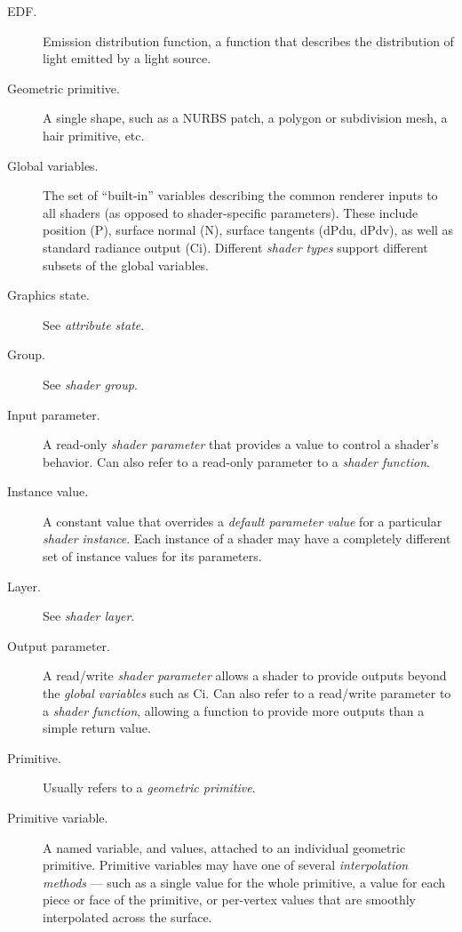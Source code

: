 \documentclass[11pt,letterpaper]{book}
\def\Ci{{\cf Ci}\xspace}
\def\N{{\cf N}\xspace}
\def\P{{\cf P}\xspace}
\def\dPdu{{\cf dPdu}\xspace}
\def\dPdv{{\cf dPdv}\xspace}
\begin{document}
\begin{appendix}
\begin{description}
\item[EDF.] Emission distribution function, a function that describes
    the distribution of light emitted by a light source.

\item[Geometric primitive.] A single shape, such as a NURBS patch, a
  polygon or subdivision mesh, a hair primitive, etc.

\item[Global variables.] The set of ``built-in'' variables describing the
  common renderer inputs to all shaders (as opposed to shader-specific
  parameters).  These include position (\P), surface normal (\N),
  surface tangents (\dPdu, \dPdv), as well as standard radiance output (\Ci).
  Different \emph{shader types} support
  different subsets of the global variables.

\item[Graphics state.] See \emph{attribute state}.

\item[Group.] See \emph{shader group}.

\item[Input parameter.] A read-only \emph{shader parameter} that provides
  a value to control a shader's behavior.  Can also refer to a read-only
  parameter to a \emph{shader function}.

\item[Instance value.] A constant value that overrides a \emph{default
  parameter value} for a particular \emph{shader instance}.  Each
  instance of a shader may have a completely different set of instance
  values for its parameters.

\item[Layer.] See \emph{shader layer}.

\item[Output parameter.] A read/write \emph{shader parameter} allows a
  shader to provide outputs beyond the \emph{global variables} such as
  \Ci.  Can also refer to a read/write parameter to a
  \emph{shader function}, allowing a function to provide more outputs
  than a simple return value.

\item[Primitive.] Usually refers to a \emph{geometric primitive}.

\item[Primitive variable.] A named variable, and values, attached to an
  individual geometric primitive.  Primitive variables may have one of
  several \emph{interpolation methods} --- such as a single value for
  the whole primitive, a value for each piece or face of the primitive,
  or per-vertex values that are smoothly interpolated across the
  surface.


\end{description}
\end{appendix}
\end{document}
